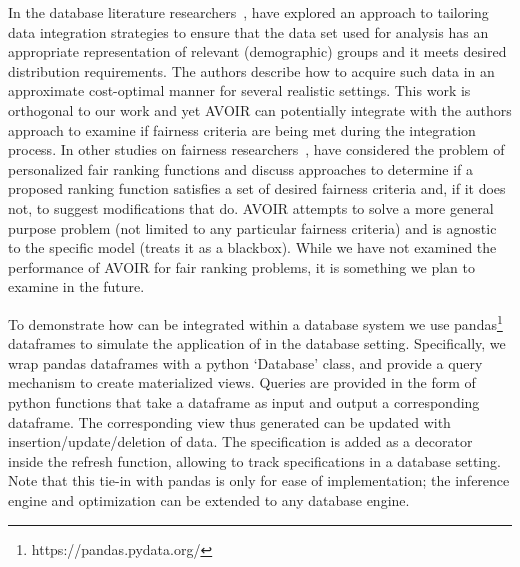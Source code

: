 \begin{subappendices}

In the database literature researchers~\cite{nargesian21tailoring}, have explored an approach to tailoring data integration strategies to ensure that the data set used for analysis has an appropriate representation of relevant (demographic) groups and it meets desired distribution requirements. The authors describe how to acquire such data in an approximate cost-optimal manner for several realistic settings. This work is orthogonal to our work and yet AVOIR can potentially integrate with the authors approach to examine if fairness criteria are being met during the integration process. In other studies on fairness researchers~\cite{yang2018nutritional,asudeh19a,asudeh19b}, have considered the problem of personalized fair ranking functions and discuss approaches to determine if a proposed ranking function satisfies a set of  desired fairness criteria and, if it does not, to suggest modifications that do. AVOIR attempts to solve a  more general purpose problem (not limited to any particular fairness criteria) and is agnostic to the specific model (treats it as a blackbox).  While we have not examined the performance of AVOIR for fair ranking problems, it is something we plan to examine in the future.

To demonstrate how \AVOIRmethodname{} can be integrated within a database system
we use pandas\footnote{https://pandas.pydata.org/} dataframes to simulate the application of \AVOIRmethodname{} in the database setting. 
Specifically, we wrap pandas dataframes with a python `Database' class, and provide a query mechanism to create materialized views.
Queries are provided in the form of python functions that take a dataframe as input and output a corresponding dataframe.
The corresponding view thus generated can be updated with insertion/update/deletion of data.
The specification is added as a decorator inside the refresh function, allowing \AVOIRmethodname{} to track specifications in a database setting.
Note that this tie-in with pandas is only for ease of implementation; the inference engine and optimization can be extended to any database engine.


\end{subappendices}